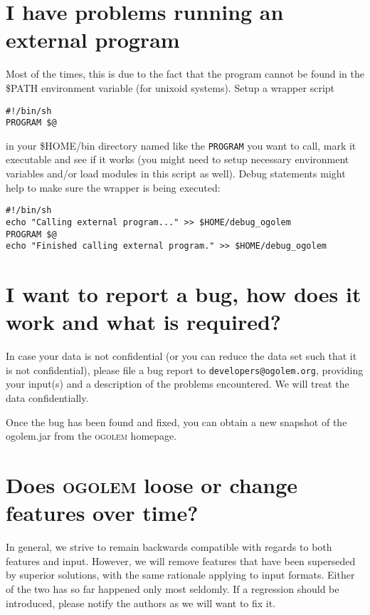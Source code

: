 \documentclass[a4paper,10pt]{scrbook}
\newcommand{\ogo}{\textsc{ogolem}}
\begin{document}
\section{I have problems running an external program}
Most of the times, this is due to the fact that the program cannot be found in
the \$PATH environment variable (for unixoid systems). Setup a wrapper script

\begin{verbatim}
#!/bin/sh
PROGRAM $@
\end{verbatim}

in your \$HOME/bin directory named like the \texttt{PROGRAM} you want to call,
mark it executable and see if it works (you might need to setup necessary
environment variables and/or load modules in this script as well). Debug
statements might help to make sure the wrapper is being executed:

\begin{verbatim}
#!/bin/sh
echo "Calling external program..." >> $HOME/debug_ogolem
PROGRAM $@
echo "Finished calling external program." >> $HOME/debug_ogolem
\end{verbatim}

\section{I want to report a bug, how does it work and what is required?}
In case your data is not confidential (or you can reduce the data set such that it
is not confidential), please file a bug report to \texttt{developers@ogolem.org}, 
providing your input(s) and a description of the problems encountered. We will 
treat the data confidentially.

Once the bug has been found and fixed, you can obtain a new snapshot of the 
ogolem.jar from the \ogo{} homepage.

\section{Does \ogo{} loose or change features over time?}
In general, we strive to remain backwards compatible with regards to both 
features 
and input. However, we will remove features that have been superseded by 
superior solutions, with the same rationale applying to input formats. Either of 
the two has so far happened only most seldomly. If a regression should be 
introduced, please notify the authors as we will want to fix it.




\end{document}
